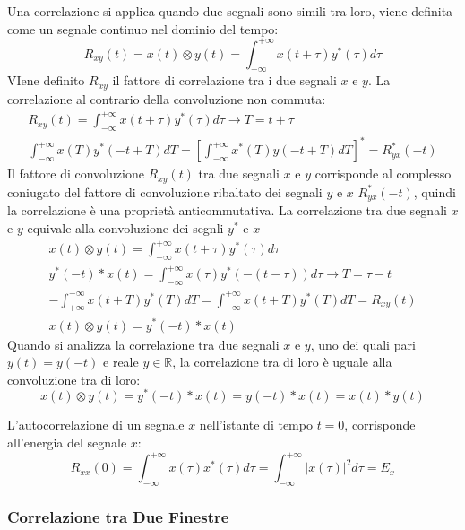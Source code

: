 \documentclass{article}
\numberwithin{equation}{subsection}
\begin{document}
Una correlazione si applica quando due segnali sono simili tra loro, viene definita come un segnale continuo nel dominio del tempo:
\begin{equation}
    R_{xy}(t)=x(t)\otimes y(t)=\int_{-\infty}^{+\infty}x(t+\tau)y^*(\tau)d\tau
\end{equation}
VIene definito $R_{xy}$ il fattore di correlazione tra i due segnali $x$ e $y$. La correlazione al contrario della convoluzione non commuta:
\begin{gather*}
    \displaystyle R_{xy}(t)=\int_{-\infty}^{+\infty}x(t+\tau)y^*(\tau)d\tau\to T=t+\tau\\
    \displaystyle\int_{-\infty}^{+\infty}x(T)y^*(-t+T)dT=\left[\int_{-\infty}^{+\infty}x^*(T)y(-t+T)dT\right]^*=R_{yx}^*(-t)
\end{gather*}
Il fattore di convoluzione $R_{xy}(t)$ tra due segnali $x$ e $y$ corrisponde al complesso coniugato del fattore di convoluzione ribaltato dei segnali $y$ e $x$ $R_{yx}^*(-t)$, 
quindi la correlazione è una proprietà anticommutativa. La correlazione tra due segnali $x$ e $y$ equivale alla convoluzione dei segnli $y^*$ e $x$
\begin{gather*}
    x(t)\otimes y(t)=\displaystyle\int_{-\infty}^{+\infty}x(t+\tau)y^*(\tau)d\tau\\
    y^*(-t)* x(t)=\displaystyle\int_{-\infty}^{+\infty}x(\tau)y^*(-(t-\tau))d\tau\to T=\tau-t\\
    -\int_{+\infty}^{-\infty}x(t+T)y^*(T)dT=\int_{-\infty}^{+\infty}x(t+T)y^*(T)dT=R_{xy}(t)\\
    x(t)\otimes y(t)=y^*(-t)*x(t)
\end{gather*}
Quando si analizza la correlazione tra due segnali $x$ e $y$, uno dei quali pari $y(t)=y(-t)$ e reale $y\in\mathbb{R}$, la correlazione tra di loro è uguale alla convoluzione 
tra di loro:
\begin{equation*}
    x(t)\otimes y(t)=y^*(-t)*x(t)=y(-t)*x(t)=x(t)*y(t)
\end{equation*}

L'autocorrelazione di un segnale $x$ nell'istante di tempo $t=0$, corrisponde all'energia del segnale $x$:
\begin{equation*}
    R_{xx}(0)=\displaystyle\int_{-\infty}^{+\infty}x(\tau)x^*(\tau)d\tau=\int_{-\infty}^{+\infty}|x(\tau)|^2d\tau=E_x
\end{equation*}

\subsubsection{Correlazione tra Due Finestre}
\end{document}
